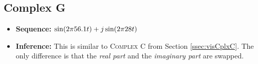 \documentclass[../../course]{subfiles}
\begin{document}
\subsection{Complex G} \label{ssec:visCplxG}

\begin{itemize} [label=]

    \item \textbf{Sequence:} $\sin(2 \pi 56.1 t) + j \sin(2 \pi 28 t)$

    \item \textbf{Inference:} This is similar to \textsc{Complex C} from Section \ref{ssec:visCplxC}.
        The only difference is that the \emph{real part} and the \emph{imaginary part} are swapped.

\end{itemize}

\vfill
\end{document}
